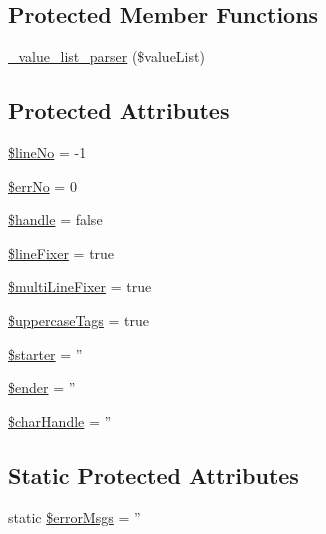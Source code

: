 \subsection*{Protected Member Functions}
\begin{DoxyCompactItemize}
\item 
\hyperlink{classSavi__Parser_a67ad30f64dcdbd2dad8787ba3f5aeb5e}{\_\-value\_\-list\_\-parser} (\$valueList)
\end{DoxyCompactItemize}
\subsection*{Protected Attributes}
\begin{DoxyCompactItemize}
\item 
\hyperlink{classSavi__Parser_a9e2fcfa96c544bf4bd3c5a71a7bf2739}{\$lineNo} = -\/1
\item 
\hyperlink{classSavi__Parser_a63d046010fb22e14107bd3861e1d9dd5}{\$errNo} = 0
\item 
\hyperlink{classSavi__Parser_ad86c3fbc5672e1deeafc5229012b0b5d}{\$handle} = false
\item 
\hyperlink{classSavi__Parser_ac37a18f959e7a225e0a690852367523d}{\$lineFixer} = true
\item 
\hyperlink{classSavi__Parser_a87f087d55e041fbc48604cfe47019f6e}{\$multiLineFixer} = true
\item 
\hyperlink{classSavi__Parser_ab025198049ed7f6ff96c43aba8c4ad20}{\$uppercaseTags} = true
\item 
\hyperlink{classSavi__Parser_a0a6ff866cad56154d31e649d69ac8c0f}{\$starter} = ''
\item 
\hyperlink{classSavi__Parser_accbd2f26bb805e2a243cab5498237ac8}{\$ender} = ''
\item 
\hyperlink{classSavi__Parser_a5a878b1c34cc555349cbc4acbcdd54e7}{\$charHandle} = ''
\end{DoxyCompactItemize}
\subsection*{Static Protected Attributes}
\begin{DoxyCompactItemize}
\item 
static \hyperlink{classSavi__Parser_af21b3b8a4d4bcfa682cd5f411e0eb566}{\$errorMsgs} = ''
\end{DoxyCompactItemize}
